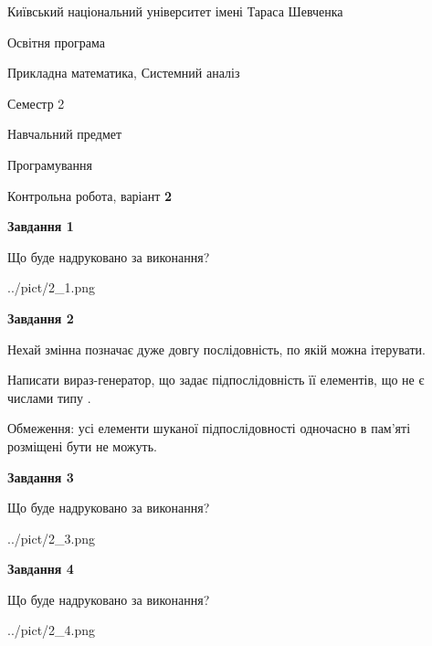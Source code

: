 \documentclass[12pt, ukrainian]{article}
\begin{document}
{{\begin {small}\par
{ \center  Київський національний університет імені Тараса Шевченка \par}
{\parbox {5 cm}{Освітня програма \hfill}{\parbox {8 cm}{Прикладна математика, Системний аналіз \hfill}}\parbox {5 cm}{\hfill Семестр 2}}\par
{\parbox {5 cm} {Навчальний предмет \hfill}\parbox {7 cm}{Програмування \hfill}\parbox {6cm}{\hfill}\par}\vspace{-7pt} \end{small}}{\center Контрольна робота, варіант  \No \textbf
{ 2 }\par}}
{
\begin {large}
{\begin {center}\textbf{Завдання 1}\end {center}}\par
Що буде надруковано за виконання?\par\par
\begin{center}
	{../pict/2_1.png}
\end{center}
\newpage

{\begin {center}\textbf{Завдання 2}\end {center}}\par
Нехай змінна  позначає дуже довгу послідовність, по якій можна ітерувати.

Написати вираз-генератор, що задає підпослідовність її елементів, що не є числами типу .

Обмеження: усі елементи шуканої підпослідовності одночасно в пам'яті розміщені бути не можуть.\par
\newpage

{\begin {center}\textbf{Завдання 3}\end {center}}\par
Що буде надруковано за виконання?
\begin{center}
	{../pict/2_3.png}
\end{center}
\newpage

{\begin {center}\textbf{Завдання 4}\end {center}}\par
Що буде надруковано за виконання?\par
\begin{center}
	{../pict/2_4.png}
\end{center}
\newpage


\end{large}}
\end{document}
